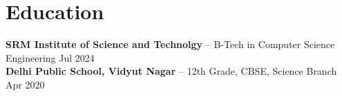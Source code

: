 \documentclass[11pt]{article}       %
\begin{document}

\vspace{-18.5pt}

\section*{Education}
\textbf{SRM Institute of Science and Technolgy} -- B-Tech in Computer Science Engineering \hfill Jul 2024 \\
\textbf{Delhi Public School, Vidyut Nagar} -- 12th Grade, CBSE, Science Branch \hfill Apr 2020 \\
\end{document}
